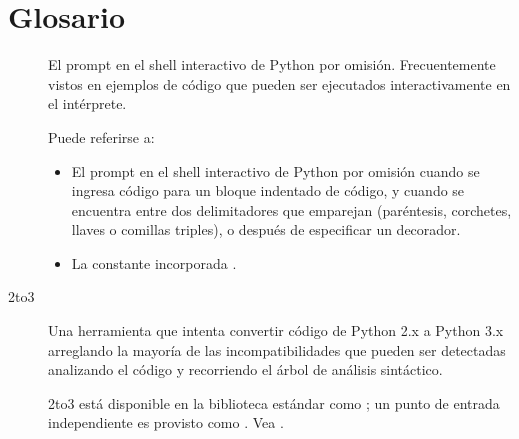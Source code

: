 \documentclass[a4,10pt,spanish]{sphinxmanual}
\begin{document}
\chapter{Glosario}
\label{\detokenize{glossary:glossary}}\label{\detokenize{glossary:id1}}\begin{description}
\item[{\sphinxcode{\sphinxupquote{>>>}}\label{\detokenize{glossary:term-0}}}] \leavevmode
\sphinxAtStartPar
El prompt en el shell interactivo de Python por omisión. Frecuentemente vistos en ejemplos de código que pueden ser ejecutados interactivamente en el intérprete.

\item[{\label{\detokenize{glossary:term-...}}}] \leavevmode
\sphinxAtStartPar
Puede referirse a:
\begin{itemize}
\item {} 
\sphinxAtStartPar
El prompt en el shell interactivo de Python por omisión cuando se ingresa código para un bloque indentado de código, y cuando se encuentra entre dos delimitadores que emparejan (paréntesis, corchetes, llaves o comillas triples), o después de especificar un decorador.

\item {} 
\sphinxAtStartPar
La constante incorporada .

\end{itemize}

\item[{2to3\label{\detokenize{glossary:term-2to3}}}] \leavevmode
\sphinxAtStartPar
Una herramienta que intenta convertir código de Python 2.x a Python 3.x arreglando la mayoría de las incompatibilidades que pueden ser detectadas analizando el código y recorriendo el árbol de análisis sintáctico.

\sphinxAtStartPar
2to3 está disponible en la biblioteca estándar como ; un punto de entrada independiente es provisto como .  Vea .


\end{description}
\end{document}
